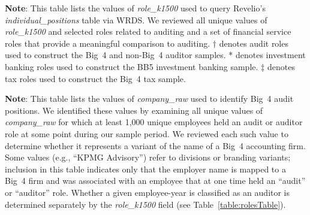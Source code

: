 \documentclass[11pt]{article}
\begin{document}
\begin{table}[h!]
\begin{flushleft}
    \begin{threeparttable}[b]
    \captionsetup{labelfont=bf, singlelinecheck=off, justification=raggedright, labelsep=none}
    \caption{: Revelio roles used to construct the samples}
    
    \begin{tablenotes}
        \footnotesize
        \item \textbf{Note}: This table lists the values of \textit{role\_k1500} used to query Revelio's \textit{individual\_positions} table via WRDS. We reviewed all unique values of \textit{role\_k1500} and selected roles related to auditing and a set of financial service roles that provide a meaningful comparison to auditing. $\dagger$ denotes audit roles used to construct the Big~4 and non-Big~4 auditor samples. * denotes investment banking roles used to construct the BB5 investment banking sample. $\ddagger$ denotes tax roles used to construct the Big~4 tax sample.
    \end{tablenotes}
    \label{table:rolesTable}
    \end{threeparttable}
\end{flushleft}
\end{table}

\clearpage
\begin{table}[h!]
\begin{flushleft}
    \begin{threeparttable}[b]
    \captionsetup{labelfont=bf, singlelinecheck=off, justification=raggedright, labelsep=none}
    \caption{: Big 4 employer name variants in Revelio}
    
    \begin{tablenotes}
        \footnotesize
        \item \textbf{Note}: This table lists the values of \textit{company\_raw} used to identify Big~4 audit positions. We identified these values by examining all unique values of \textit{company\_raw} for which at least 1,000 unique employees held an audit or auditor role at some point during our sample period. We reviewed each such value to determine whether it represents a variant of the name of a Big~4 accounting firm. Some values (e.g., ``KPMG Advisory'') refer to divisions or branding variants; inclusion in this table indicates only that the employer name is mapped to a Big~4 firm and was associated with an employee that at one time held an ``audit'' or ``auditor'' role. Whether a given employee-year is classified as an auditor is determined separately by the \textit{role\_k1500} field (see Table~\ref{table:rolesTable}).
    \end{tablenotes}
    \label{table:firmNamesTable}
    \end{threeparttable}
\end{flushleft}
\end{table}
\end{document}
